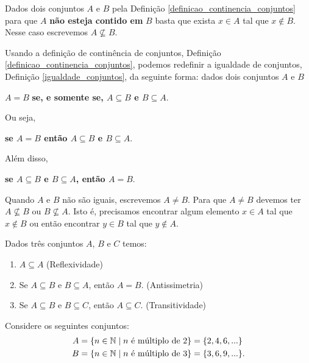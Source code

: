 \begin{observacao}
	Dados dois conjuntos $A$ e $B$ pela Defini\c{c}\~ao \ref{definicao_continencia_conjuntos} para que $A$ \textbf{n\~ao esteja contido em} $B$ basta que exista $x \in A$ tal que $x \notin B$. Nesse caso escrevemos $A \nsubseteq B$.
\end{observacao}

Usando a defini\c{c}\~ao de contin\^encia de conjuntos, Defini\c{c}\~ao \ref{definicao_continencia_conjuntos}, podemos redefinir a igualdade de conjuntos, Defini\c{c}\~ao \ref{igualdade_conjuntos}, da seguinte forma: dados dois conjuntos $A$ e $B$
\begin{center}
	$A = B$ \textbf{se, e somente se, $A \subseteq B$ e $B \subseteq A$}.
\end{center}

Ou seja,
\begin{center}
	\textbf{se $A = B$ ent{\~a}o $A \subseteq B$ e $B \subseteq A$}.
\end{center}

Al\'em disso,
\begin{center}
	\textbf{se $A \subseteq B$ e $B \subseteq A$, ent{\~a}o $A = B$}.
\end{center}

Quando $A$ e $B$ n{\~a}o s{\~a}o iguais, escrevemos $A \neq B$. Para que $A \neq B$ devemos ter $A \nsubseteq B$ ou $B \nsubseteq A$. Isto \'e, precisamos encontrar algum elemento $x \in A$ tal que $x \notin B$ ou ent\~ao encontrar $y \in B$ tal que $y \notin A$.

\begin{proposicao}
	Dados tr\^es conjuntos $A$, $B$ e $C$ temos:
	\begin{enumerate}[label={\roman*})]
		\item $A\subseteq A$ (Reflexividade)
		\item Se $A\subseteq B \mbox{ e } B\subseteq A$, ent{\~a}o $A=B$. (Antissimetria)
		\item Se $A\subseteq B$ e $B\subseteq C$, ent{\~a}o $A\subseteq C$. (Transitividade)
	\end{enumerate}
\end{proposicao}


Considere os seguintes conjuntos:
\begin{align*}
	A &= \{ n \in \mathbb{N} \mid n \mbox{ {\'e} m{\'u}ltiplo de } 2\} = \{2,4,6,...\}\\
	B &= \{n \in \mathbb{N} \mid n \mbox{ {\'e} m{\'u}ltiplo de } 3\} = \{3,6,9,...\}.
\end{align*}


